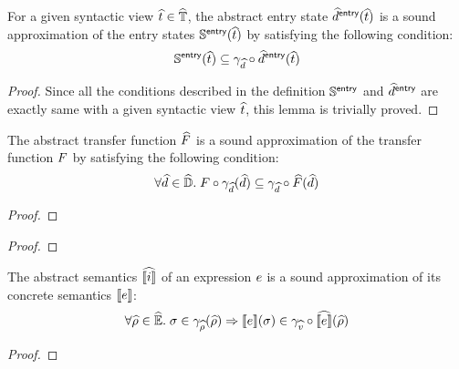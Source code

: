 \begin{lemma}\label{lem:sound-entryaelem}
  For a given syntactic view $\widehat{t} \in \widehat{\mathbb{T}}$, the abstract entry state
  $\widehat{d}^{\textsf{entry}}(\widehat{t})$ is a sound approximation of the entry states
  $\mathbb{S}^{\textsf{entry}}(\widehat{t})$ by satisfying the following condition:
  \[
    \mathbb{S}^{\textsf{entry}}(\widehat{t}) \subseteq \gamma_{\widehat{d}} \circ \widehat{d}^{\textsf{entry}}(\widehat{t})
  \]
\end{lemma}
\begin{proof}
  Since all the conditions described in the definition $\mathbb{S}^{\textsf{entry}}$ and
  $\widehat{d}^{\textsf{entry}}$ are exactly same with a given syntactic view $\widehat{t}$, this
  lemma is trivially proved.
\end{proof}

\begin{lemma}\label{lem:sound-atransfer}
  The abstract transfer function $\widehat{F}$ is a sound approximation of the
  transfer function $F$ by satisfying the following condition:
  \[
    \forall \widehat{d} \in \widehat{\mathbb{D}}. \;
    F \circ \gamma_{\widehat{d}}(\widehat{d}) \subseteq
    \gamma_{\widehat{d}} \circ \widehat{F}(\widehat{d})
  \]
\end{lemma}
\begin{proof}
  \todo
\end{proof}

\begin{lemma}\label{lem:sound-inst}
  \todo
\end{lemma}
\begin{proof}
  \todo
\end{proof}

\begin{lemma}\label{lem:sound-inst}
  The abstract semantics $\widehat{\llbracket{i}\rrbracket}$ of an expression $e$ is a sound
  approximation of its concrete semantics $\llbracket{e}\rrbracket$:
  \[
    \forall \widehat{\rho} \in \widehat{\mathbb{E}}. \;
    \sigma \in \gamma_{\widehat{\rho}}(\widehat{\rho}) \Rightarrow
    \llbracket{e}\rrbracket(\sigma) \in \gamma_{\widehat{v}} \circ \widehat{\llbracket{e}\rrbracket}(\widehat{\rho})
  \]
\end{lemma}
\begin{proof}
  \todo
\end{proof}

